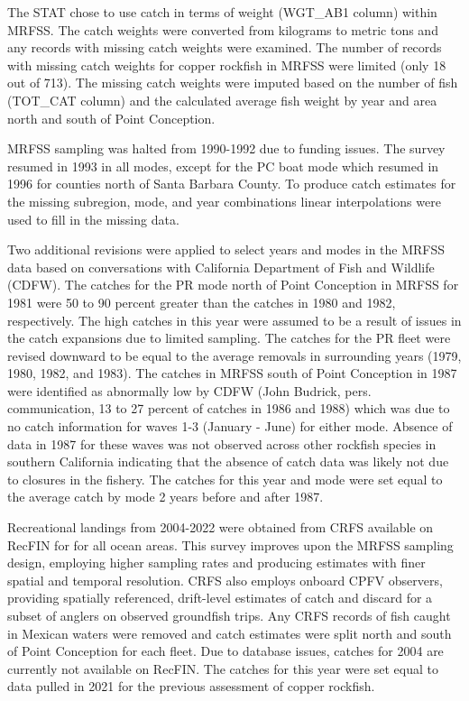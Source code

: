 \documentclass[11pt,
  english,
  letterpaper,
]{article}
\begin{document}
The STAT chose to use catch in terms of weight (WGT\_AB1 column) within MRFSS. The catch weights were converted from kilograms to metric tons and any records with missing catch weights were examined. The number of records with missing catch weights for copper rockfish in MRFSS were limited (only 18 out of 713). The missing catch weights were imputed based on the number of fish (TOT\_CAT column) and the calculated average fish weight by year and area north and south of Point Conception.

MRFSS sampling was halted from 1990-1992 due to funding issues. The survey resumed in 1993 in all modes, except for the PC boat mode which resumed in 1996 for counties north of Santa Barbara County. To produce catch estimates for the missing subregion, mode, and year combinations linear interpolations were used to fill in the missing data.

Two additional revisions were applied to select years and modes in the MRFSS data based on conversations with California Department of Fish and Wildlife (CDFW). The catches for the PR mode north of Point Conception in MRFSS for 1981 were 50 to 90 percent greater than the catches in 1980 and 1982, respectively. The high catches in this year were assumed to be a result of issues in the catch expansions due to limited sampling. The catches for the PR fleet were revised downward to be equal to the average removals in surrounding years (1979, 1980, 1982, and 1983). The catches in MRFSS south of Point Conception in 1987 were identified as abnormally low by CDFW (John Budrick, pers. communication, 13 to 27 percent of catches in 1986 and 1988) which was due to no catch information for waves 1-3 (January - June) for either mode. Absence of data in 1987 for these waves was not observed across other rockfish species in southern California indicating that the absence of catch data was likely not due to closures in the fishery. The catches for this year and mode were set equal to the average catch by mode 2 years before and after 1987.

Recreational landings from 2004-2022 were obtained from CRFS available on RecFIN for for all ocean areas. This survey improves upon the MRFSS sampling design, employing higher sampling rates and producing estimates with finer spatial and temporal resolution. CRFS also employs onboard CPFV observers, providing spatially referenced, drift-level estimates of catch and discard for a subset of anglers on observed groundfish trips. Any CRFS records of fish caught in Mexican waters were removed and catch estimates were split north and south of Point Conception for each fleet. Due to database issues, catches for 2004 are currently not available on RecFIN. The catches for this year were set equal to data pulled in 2021 for the previous assessment of copper rockfish.
\end{document}

